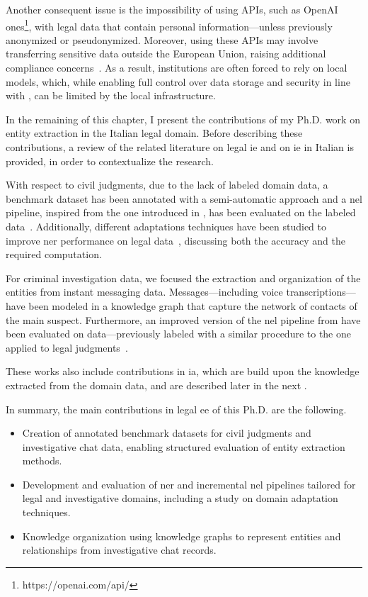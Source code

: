 Another consequent issue is the impossibility of using APIs, such as OpenAI ones\footnote{https://openai.com/api/}, with legal data that contain personal information---unless previously anonymized or pseudonymized. Moreover, using these APIs may involve transferring sensitive data outside the European Union, raising additional compliance concerns~\cite[Article~44]{gdpr2016}. As a result, institutions are often forced to rely on local models, which, while enabling full control over data storage and security in line with \textcite[Article~32]{gdpr2016}, can be limited by the local infrastructure.

In the remaining of this chapter, I present the contributions of my Ph.D. work on entity extraction in the Italian legal domain.
Before describing these contributions, a review of the related literature on legal \ac{ie} and on \ac{ie} in Italian is provided, in order to contextualize the research.

With respect to civil judgments, due to the lack of labeled domain data, a benchmark dataset has been annotated with a semi-automatic approach and a \ac{nel} pipeline, inspired from the one introduced in , has been evaluated on the labeled data~\cite{BELLANDI2024}. Additionally, different adaptations techniques have been studied to improve \ac{ner} performance on legal data~\cite{aixia_2023}, discussing both the accuracy and the required computation.

For criminal investigation data, we focused the extraction and organization of the entities from instant messaging data. Messages---including voice transcriptions---have been modeled in a knowledge graph that capture the network of contacts of the main suspect. Furthermore, an improved version of the \ac{nel} pipeline from  have been evaluated on data---previously labeled with a similar procedure to the one applied to legal judgments~\cite{pozzi_wise_2025}.

These works also include contributions in \acl{ia}, which are build upon the knowledge extracted from the domain data, and are described later in the next .

In summary, the main contributions in legal \ac{ee} of this Ph.D. are the following.
\begin{itemize}
    \item Creation of annotated benchmark datasets for civil judgments and investigative chat data, enabling structured evaluation of entity extraction methods.
    \item Development and evaluation of \ac{ner} and incremental \ac{nel} pipelines tailored for legal and investigative domains, including a study on domain adaptation techniques.
    \item Knowledge organization using knowledge graphs to represent entities and relationships from investigative chat records.
\end{itemize}